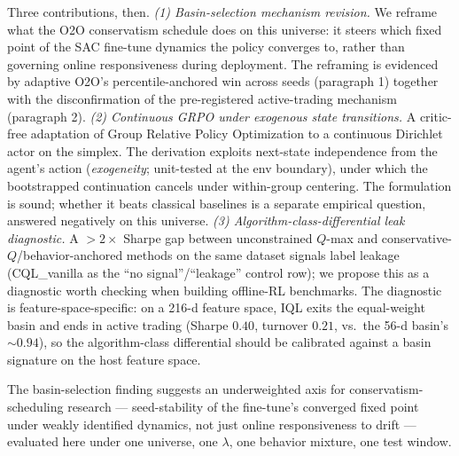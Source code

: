 Three contributions, then. \emph{(1) Basin-selection mechanism revision.}
We reframe what the O2O conservatism schedule does on this universe:
it steers which fixed point of the SAC fine-tune dynamics the policy
converges to, rather than governing online responsiveness during
deployment. The reframing is evidenced by adaptive O2O's
percentile-anchored win across seeds (paragraph 1) together with the
disconfirmation of the pre-registered active-trading mechanism
(paragraph 2). \emph{(2) Continuous GRPO under exogenous state
transitions.} A critic-free adaptation of Group Relative Policy
Optimization to a continuous Dirichlet actor on the simplex. The
derivation exploits next-state independence from the agent's action
(\emph{exogeneity}; unit-tested at the env boundary), under which the
bootstrapped continuation cancels under within-group centering. The
formulation is sound; whether it beats classical baselines is a
separate empirical question, answered negatively on this universe.
\emph{(3) Algorithm-class-differential leak diagnostic.} A
$> 2\times$ Sharpe gap between unconstrained $Q$-max and
conservative-$Q$/behavior-anchored methods on the same dataset signals
label leakage (CQL\_vanilla as the ``no signal''/``leakage'' control
row); we propose this as a diagnostic worth checking when building
offline-RL benchmarks. The diagnostic is feature-space-specific:
on a 216-d feature space, IQL exits the equal-weight basin and ends
in active trading (Sharpe $0.40$, turnover $0.21$, vs.\ the 56-d
basin's $\sim\!0.94$), so the algorithm-class differential should be
calibrated against a basin signature on the host feature space.

The basin-selection finding suggests an underweighted axis for
conservatism-scheduling research --- seed-stability of the fine-tune's
converged fixed point under weakly identified dynamics, not just
online responsiveness to drift --- evaluated here under one universe,
one $\lambda$, one behavior mixture, one test window.
